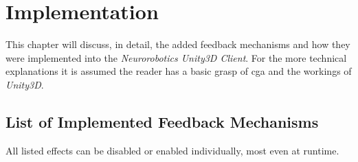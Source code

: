 
\chapter{Implementation}\label{chapter:Implementation}

This chapter will discuss, in detail, the added feedback mechanisms and how they were implemented into the \textit{Neurorobotics Unity3D Client}. For the more technical explanations it is assumed the reader has a basic grasp of \gls{cga} and the workings of \textit{Unity3D}.


\section{List of Implemented Feedback Mechanisms}\label{section:feedbackMechanismList}

All listed effects can be disabled or enabled individually, most even at runtime.

